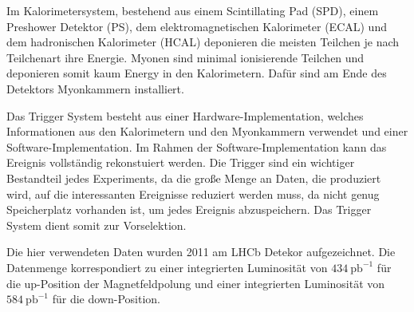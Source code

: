 Im Kalorimetersystem, bestehend aus einem Scintillating Pad (SPD), einem 
Preshower Detektor (PS), dem elektromagnetischen Kalorimeter (ECAL) und 
dem hadronischen Kalorimeter (HCAL) deponieren die meisten Teilchen je nach Teilchenart 
ihre Energie. Myonen sind minimal ionisierende Teilchen und deponieren somit kaum 
Energy in den Kalorimetern. Dafür sind am Ende des Detektors Myonkammern installiert. \par 

Das Trigger System besteht aus einer Hardware-Implementation, welches Informationen aus 
den Kalorimetern und den Myonkammern verwendet und einer Software-Implementation. Im 
Rahmen der Software-Implementation kann das Ereignis vollständig rekonstuiert werden. 
Die Trigger sind ein wichtiger Bestandteil jedes Experiments, da die große Menge an 
Daten, die produziert wird, auf die interessanten Ereignisse reduziert werden muss, 
da nicht genug Speicherplatz vorhanden ist, um jedes Ereignis abzuspeichern. Das Trigger 
System dient somit zur Vorselektion. \par 

Die hier verwendeten Daten wurden 2011 am LHCb Detekor aufgezeichnet. Die Datenmenge 
korrespondiert zu einer integrierten Luminosität von $\SI{434}{\pico\barn}^{-1}$ für 
die up-Position der Magnetfeldpolung und einer integrierten Luminosität von 
$\SI{584}{\pico\barn}^{-1}$ für die down-Position.